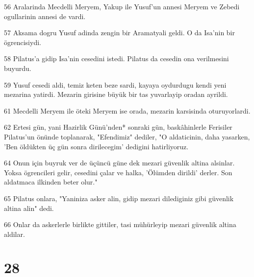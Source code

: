 \par 56 Aralarinda Mecdelli Meryem, Yakup ile Yusuf'un annesi Meryem ve Zebedi ogullarinin annesi de vardi.
\par 57 Aksama dogru Yusuf adinda zengin bir Aramatyali geldi. O da Isa'nin bir ögrencisiydi.
\par 58 Pilatus'a gidip Isa'nin cesedini istedi. Pilatus da cesedin ona verilmesini buyurdu.
\par 59 Yusuf cesedi aldi, temiz keten beze sardi, kayaya oydurdugu kendi yeni mezarina yatirdi. Mezarin girisine büyük bir tas yuvarlayip oradan ayrildi.
\par 61 Mecdelli Meryem ile öteki Meryem ise orada, mezarin karsisinda oturuyorlardi.
\par 62 Ertesi gün, yani Hazirlik Günü'nden* sonraki gün, baskâhinlerle Ferisiler Pilatus'un önünde toplanarak, "Efendimiz" dediler, "O aldaticinin, daha yasarken, 'Ben öldükten üç gün sonra dirilecegim' dedigini hatirliyoruz.
\par 64 Onun için buyruk ver de üçüncü güne dek mezari güvenlik altina alsinlar. Yoksa ögrencileri gelir, cesedini çalar ve halka, 'Ölümden dirildi' derler. Son aldatmaca ilkinden beter olur."
\par 65 Pilatus onlara, "Yaniniza asker alin, gidip mezari dilediginiz gibi güvenlik altina alin" dedi.
\par 66 Onlar da askerlerle birlikte gittiler, tasi mühürleyip mezari güvenlik altina aldilar.

\chapter{28}

